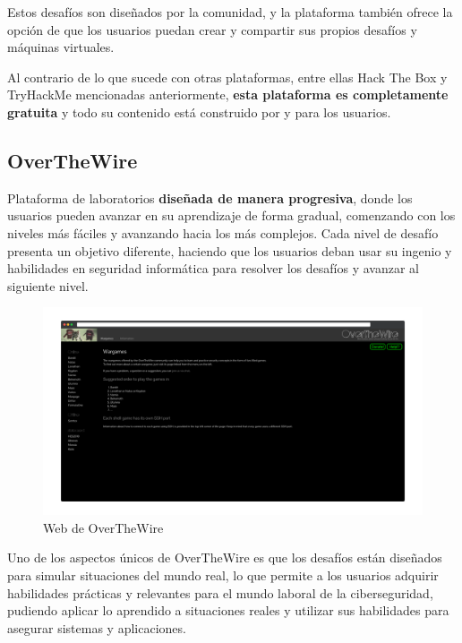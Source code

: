             Estos desafíos son diseñados por la comunidad, y la plataforma también ofrece la opción de que los usuarios puedan crear y compartir sus propios desafíos y máquinas virtuales.
            
            Al contrario de lo que sucede con otras plataformas, entre ellas Hack The Box y TryHackMe mencionadas anteriormente, \textbf{esta plataforma es completamente gratuita} y todo su contenido está construido por y para los usuarios.
            
            \newpage
        
        
        \subsection{OverTheWire}
        
            Plataforma de laboratorios \textbf{diseñada de manera progresiva}, donde los usuarios pueden avanzar en su aprendizaje de forma gradual, comenzando con los niveles más fáciles y avanzando hacia los más complejos. Cada nivel de desafío presenta un objetivo diferente, haciendo que los usuarios deban usar su ingenio y habilidades en seguridad informática para resolver los desafíos y avanzar al siguiente nivel.
            
            \begin{figure}[h]
                \centering

                \includegraphics[width=\textwidth]{images/Capturas/Web de OverTheWire.png}

                \caption{Web de OverTheWire}
                \label{fig:OverTheWire-web}
            \end{figure}
            
            Uno de los aspectos únicos de OverTheWire es que los desafíos están diseñados para simular situaciones del mundo real, lo que permite a los usuarios adquirir habilidades prácticas y relevantes para el mundo laboral de la ciberseguridad, pudiendo aplicar lo aprendido a situaciones reales y utilizar sus habilidades para asegurar sistemas y aplicaciones.
            
